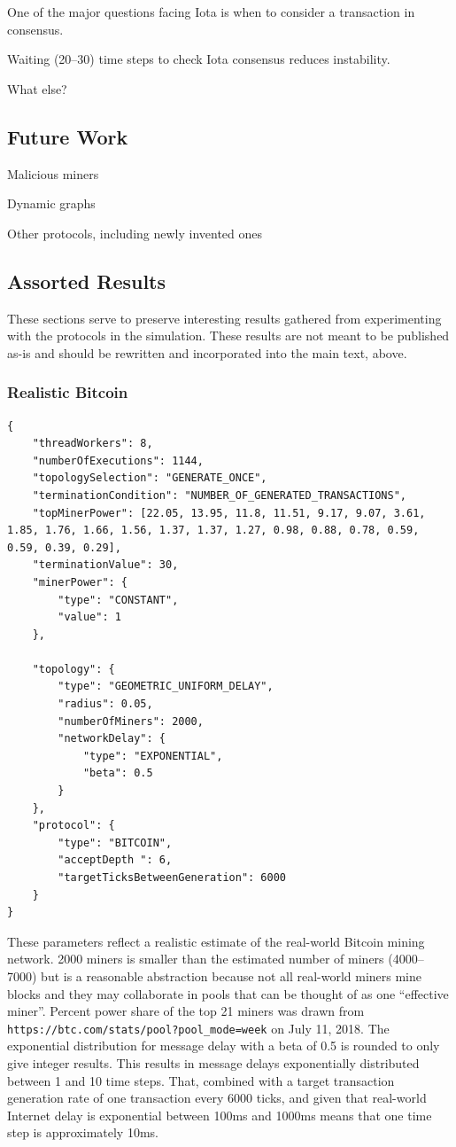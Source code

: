 \documentclass[letterpaper,11pt]{article}
\begin{document}
One of the major questions facing Iota is when to consider a transaction in consensus.

Waiting (20--30) time steps to check Iota consensus reduces instability.

What else?

\subsection{Future Work}
Malicious miners

Dynamic graphs

Other protocols, including newly invented ones

\subsection{Assorted Results}
These sections serve to preserve interesting results gathered from experimenting with the protocols in the simulation. These results are not meant to be published as-is and should be rewritten and incorporated into the main text, above.

\subsubsection{Realistic Bitcoin}
\begin{verbatim}
{
    "threadWorkers": 8,
    "numberOfExecutions": 1144,
    "topologySelection": "GENERATE_ONCE", 
    "terminationCondition": "NUMBER_OF_GENERATED_TRANSACTIONS",
    "topMinerPower": [22.05, 13.95, 11.8, 11.51, 9.17, 9.07, 3.61, 1.85, 1.76, 1.66, 1.56, 1.37, 1.37, 1.27, 0.98, 0.88, 0.78, 0.59, 0.59, 0.39, 0.29],
    "terminationValue": 30,
    "minerPower": {
        "type": "CONSTANT",
        "value": 1
    },

    "topology": {
        "type": "GEOMETRIC_UNIFORM_DELAY",
        "radius": 0.05,
        "numberOfMiners": 2000,
        "networkDelay": {
            "type": "EXPONENTIAL",
            "beta": 0.5
        }
    },
    "protocol": {
        "type": "BITCOIN",
        "acceptDepth ": 6,
        "targetTicksBetweenGeneration": 6000
    }
}
\end{verbatim}

These parameters reflect a realistic estimate of the real-world Bitcoin mining network. 2000 miners is smaller than the estimated number of miners (4000--7000) but is a reasonable abstraction because not all real-world miners mine blocks and they may collaborate in pools that can be thought of as one ``effective miner''.  Percent power share of the top 21 miners was drawn from \verb|https://btc.com/stats/pool?pool_mode=week| on July 11, 2018. The exponential distribution for message delay with a beta of 0.5 is rounded to only give integer results. This results in message delays exponentially distributed between 1 and 10 time steps. That, combined with a target transaction generation rate of one transaction every 6000 ticks, and given that real-world Internet delay is exponential between 100ms and 1000ms means that one time step is approximately 10ms.
\end{document}
